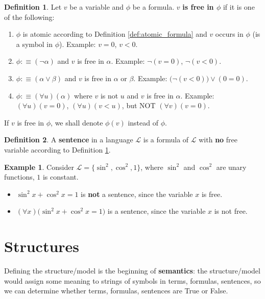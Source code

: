 \documentclass[11pt,letterpaper]{book}
\theoremstyle{definition}
\newtheorem{definition}{Definition}[section]
\newtheorem{example}{Example}[section]
\begin{document}
\begin{definition}\label{def:free_var}
Let $v$ be a variable and $\phi$ be a formula. $v$ \textbf{is free in
$\phi$} if it is one of the following:
\begin{enumerate}
\item{$\phi$ is atomic according to Definition \ref{def:atomic_formula}
and $v$ occurs in $\phi$ (is a symbol in $\phi$). Example: $v=0$, $v<0$.}
\item{$\phi :\equiv (\lnot \alpha)$ and $v$ is free in $\alpha$.
Example: $\lnot (v = 0)$, $\lnot (v <0)$.}
\item{$\phi :\equiv (\alpha \lor \beta)$ and $v$ is free in $\alpha$ or
$\beta$. Example: $\big( \lnot (v<0) \big) \lor (0 = 0)$.}
\item{$\phi :\equiv (\forall u) (\alpha)$ where $v$ is not $u$ and $v$
is free in $\alpha$. Example: $(\forall u ) (v = 0)$, $(\forall u) (v <
u)$, but NOT $(\forall v) (v = 0) $.}
\end{enumerate}

\end{definition}

If $v$ is free in $\phi$, we shall denote $\phi(v)$ instead of $\phi$.

\begin{definition}
A \textbf{sentence} in a language $\mathcal{L}$ is a formula of
$\mathcal{L}$ with \textbf{no} free variable according to Definition
\ref{def:free_var}.
\end{definition}

\begin{example}
Consider $\mathcal{L} = \{ \sin ^2 , \cos ^2, 1  \}$, where $\sin ^2$
and $\cos ^2$ are unary functions, $1$ is constant.
\begin{itemize}
\item{$\sin^2 x + \cos^2 x = 1$ is \textbf{not} a sentence, since the
variable $x$ is free.}
\item{$( \forall x) \big( \sin^2 x + \cos^2 x = 1 \big)$ is a sentence,
since the variable $x$ is not free.}
\end{itemize}

\end{example}


\section{Structures}


Defining the structure/model is the beginning of \textbf{semantics}: the
structure/model would assign some meaning to strings of symbols in
terms, formulas, sentences, so we can determine whether terms, formulas,
sentences are True or False.
\end{document}
